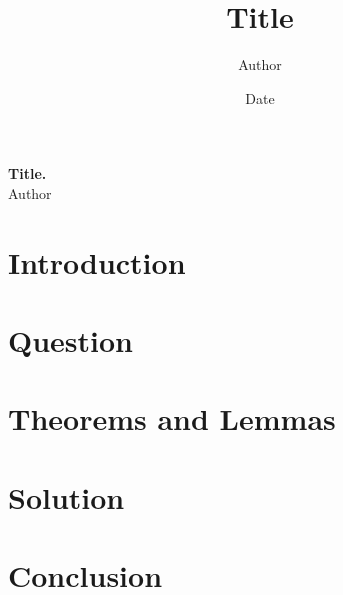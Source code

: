 \documentclass[12pt]{report}
\title{Title}
\author{Author}
\date{Date}
\begin{document}
	
	\begin{center}
		\textbf{Title.} \\[8pt]
		\small{Author} \\
	\end{center}
	
	
	\section{Introduction}

	
	\section{Question}

	
	\section{Theorems and Lemmas}
	

	\section{Solution}
	
	
	\section{Conclusion}
	
	
\end{document}
